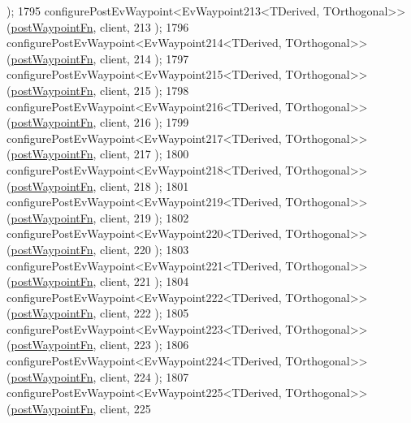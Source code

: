 \begin{DoxyCode}
      );
1795     configurePostEvWaypoint<EvWaypoint213<TDerived, TOrthogonal>>(\hyperlink{classcl__move__base__z_1_1WaypointEventDispatcher_a964a57fcce5d48ec60243230722d8dd7}{postWaypointFn}, client, 213
      );
1796     configurePostEvWaypoint<EvWaypoint214<TDerived, TOrthogonal>>(\hyperlink{classcl__move__base__z_1_1WaypointEventDispatcher_a964a57fcce5d48ec60243230722d8dd7}{postWaypointFn}, client, 214
      );
1797     configurePostEvWaypoint<EvWaypoint215<TDerived, TOrthogonal>>(\hyperlink{classcl__move__base__z_1_1WaypointEventDispatcher_a964a57fcce5d48ec60243230722d8dd7}{postWaypointFn}, client, 215
      );
1798     configurePostEvWaypoint<EvWaypoint216<TDerived, TOrthogonal>>(\hyperlink{classcl__move__base__z_1_1WaypointEventDispatcher_a964a57fcce5d48ec60243230722d8dd7}{postWaypointFn}, client, 216
      );
1799     configurePostEvWaypoint<EvWaypoint217<TDerived, TOrthogonal>>(\hyperlink{classcl__move__base__z_1_1WaypointEventDispatcher_a964a57fcce5d48ec60243230722d8dd7}{postWaypointFn}, client, 217
      );
1800     configurePostEvWaypoint<EvWaypoint218<TDerived, TOrthogonal>>(\hyperlink{classcl__move__base__z_1_1WaypointEventDispatcher_a964a57fcce5d48ec60243230722d8dd7}{postWaypointFn}, client, 218
      );
1801     configurePostEvWaypoint<EvWaypoint219<TDerived, TOrthogonal>>(\hyperlink{classcl__move__base__z_1_1WaypointEventDispatcher_a964a57fcce5d48ec60243230722d8dd7}{postWaypointFn}, client, 219
      );
1802     configurePostEvWaypoint<EvWaypoint220<TDerived, TOrthogonal>>(\hyperlink{classcl__move__base__z_1_1WaypointEventDispatcher_a964a57fcce5d48ec60243230722d8dd7}{postWaypointFn}, client, 220
      );
1803     configurePostEvWaypoint<EvWaypoint221<TDerived, TOrthogonal>>(\hyperlink{classcl__move__base__z_1_1WaypointEventDispatcher_a964a57fcce5d48ec60243230722d8dd7}{postWaypointFn}, client, 221
      );
1804     configurePostEvWaypoint<EvWaypoint222<TDerived, TOrthogonal>>(\hyperlink{classcl__move__base__z_1_1WaypointEventDispatcher_a964a57fcce5d48ec60243230722d8dd7}{postWaypointFn}, client, 222
      );
1805     configurePostEvWaypoint<EvWaypoint223<TDerived, TOrthogonal>>(\hyperlink{classcl__move__base__z_1_1WaypointEventDispatcher_a964a57fcce5d48ec60243230722d8dd7}{postWaypointFn}, client, 223
      );
1806     configurePostEvWaypoint<EvWaypoint224<TDerived, TOrthogonal>>(\hyperlink{classcl__move__base__z_1_1WaypointEventDispatcher_a964a57fcce5d48ec60243230722d8dd7}{postWaypointFn}, client, 224
      );
1807     configurePostEvWaypoint<EvWaypoint225<TDerived, TOrthogonal>>(\hyperlink{classcl__move__base__z_1_1WaypointEventDispatcher_a964a57fcce5d48ec60243230722d8dd7}{postWaypointFn}, client, 225

\end{DoxyCode}

